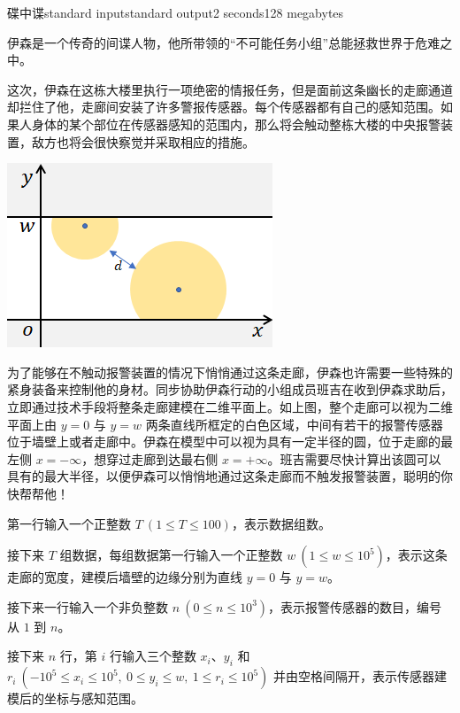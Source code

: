 \begin{problem}{碟中谍}{standard input}{standard output}{2 seconds}{128 megabytes}

    伊森是一个传奇的间谍人物，他所带领的“不可能任务小组”总能拯救世界于危难之中。

    这次，伊森在这栋大楼里执行一项绝密的情报任务，但是面前这条幽长的走廊通道却拦住了他，走廊间安装了许多警报传感器。每个传感器都有自己的感知范围。如果人身体的某个部位在传感器感知的范围内，那么将会触动整栋大楼的中央报警装置，敌方也将会很快察觉并采取相应的措施。

    \begin{center}
        \includegraphics{Official/3.png}
    \end{center}

    为了能够在不触动报警装置的情况下悄悄通过这条走廊，伊森也许需要一些特殊的紧身装备来控制他的身材。同步协助伊森行动的小组成员班吉在收到伊森求助后，立即通过技术手段将整条走廊建模在二维平面上。如上图，整个走廊可以视为二维平面上由 $y=0$ 与 $y=w$ 两条直线所框定的白色区域，中间有若干的报警传感器位于墙壁上或者走廊中。伊森在模型中可以视为具有一定半径的圆，位于走廊的最左侧 $x=-\infty$，想穿过走廊到达最右侧 $x=+\infty$。班吉需要尽快计算出该圆可以具有的最大半径，以便伊森可以悄悄地通过这条走廊而不触发报警装置，聪明的你快帮帮他！


    \InputFile

    第一行输入一个正整数 $T\ (1\le T\le 100)$，表示数据组数。
    
    接下来 $T$ 组数据，每组数据第一行输入一个正整数 $w\ (1\le w\le 10^5)$，表示这条走廊的宽度，建模后墙壁的边缘分别为直线 $y=0$ 与 $y=w$。

    接下来一行输入一个非负整数 $n\ (0\le n\le 10^3)$，表示报警传感器的数目，编号从 $1$ 到 $n$。

    接下来 $n$ 行，第 $i$ 行输入三个整数 $x_i$、$y_i$ 和 $r_i\ (-10^5\le x_i\le 10^5,\ 0\le y_i\le w,\ 1\le r_i\le 10^5)$ 并由空格间隔开，表示传感器建模后的坐标与感知范围。
    

\end{problem}
